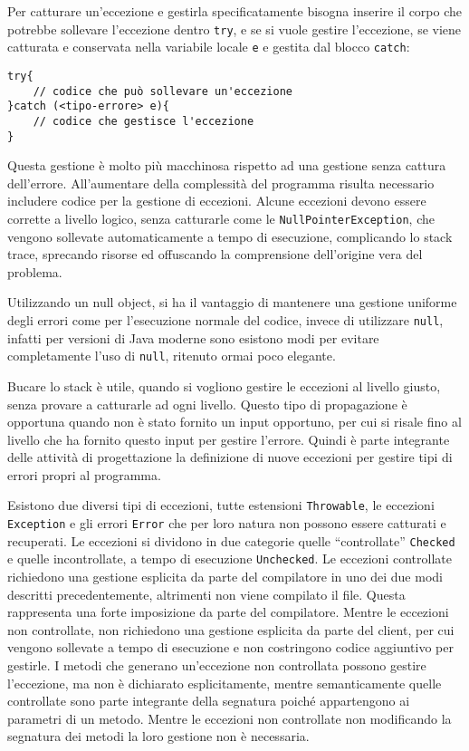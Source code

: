 \documentclass{article}
\numberwithin{equation}{subsection}
\begin{document}
Per catturare un'eccezione e gestirla specificatamente bisogna inserire il corpo che potrebbe sollevare l'eccezione dentro \verb|try|, e se si vuole gestire l'eccezione, 
se viene catturata e conservata nella variabile locale \verb|e| e gestita dal blocco \verb|catch|:
\begin{verbatim}
try{
    // codice che può sollevare un'eccezione
}catch (<tipo-errore> e){
    // codice che gestisce l'eccezione
}   
\end{verbatim}

Questa gestione è molto più macchinosa rispetto ad una gestione senza cattura dell'errore. All'aumentare della complessità del programma risulta necessario includere 
codice per la gestione di eccezioni. 
Alcune eccezioni devono essere corrette a livello logico, senza catturarle come le \verb|NullPointerException|, che vengono sollevate automaticamente a tempo di esecuzione, 
complicando lo stack trace, sprecando risorse ed offuscando la comprensione dell'origine vera del problema. 


Utilizzando un null object, si ha il vantaggio di mantenere una gestione uniforme degli errori come per l'esecuzione normale del codice, invece di utilizzare \verb|null|, 
infatti per versioni di Java moderne sono esistono modi per evitare completamente l'uso di \verb|null|, ritenuto ormai poco elegante. 

Bucare lo stack è utile, quando si vogliono gestire le eccezioni al livello giusto, senza provare a catturarle ad ogni livello. Questo tipo di propagazione è opportuna 
quando non è stato fornito un input opportuno, per cui si risale fino al livello che ha fornito questo input per gestire l'errore. 
Quindi è parte integrante delle attività di progettazione la definizione di nuove eccezioni per gestire tipi di errori propri al programma. 


Esistono due diversi tipi di eccezioni, tutte estensioni \verb|Throwable|, le eccezioni \verb|Exception| e gli errori \verb|Error| che per loro natura non possono essere 
catturati e recuperati. 
Le eccezioni si dividono in due categorie quelle ``controllate'' \verb|Checked| e quelle incontrollate, a tempo di esecuzione \verb|Unchecked|. Le eccezioni controllate richiedono 
una gestione esplicita da parte del compilatore in uno dei due modi descritti precedentemente, altrimenti non viene compilato il file. 
Questa rappresenta una forte imposizione da parte del compilatore. 
Mentre le eccezioni non controllate, 
non richiedono una gestione esplicita da parte del client, per cui vengono sollevate a tempo di esecuzione e non costringono codice aggiuntivo per gestirle. 
I metodi che generano un'eccezione non controllata possono gestire l'eccezione, ma non è dichiarato esplicitamente, mentre semanticamente quelle controllate sono parte 
integrante della segnatura poiché appartengono ai parametri di un metodo. Mentre le eccezioni non controllate non modificando la segnatura dei metodi la loro 
gestione non è necessaria. 
\end{document}

